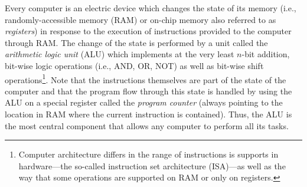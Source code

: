 \label{sec:adders}
Every computer is an electric device which changes the state of its memory (i.e., randomly-accessible memory (RAM) or on-chip memory also referred to as {\em registers}) in response to the execution of instructions provided to the computer through RAM. The change of the state is performed by a unit called the {\em arithmetic logic unit} (ALU) which implements at the very least $n$-bit addition, bit-wise logic operations (i.e., AND, OR, NOT) as well as bit-wise shift operations\footnote{Computer architecture differs in the range of instructions is supports in hardware---the so-called instruction set architecture (ISA)---as well as the way that some operations are supported on RAM or only on registers.}. Note that the instructions themselves are part of the state of the computer and that the program flow through this state is handled by using the ALU on a special register called the {\em program counter} (always pointing to the location in RAM where the current instruction is contained). Thus, the ALU is the most central component that allows any computer to perform all its tasks.

